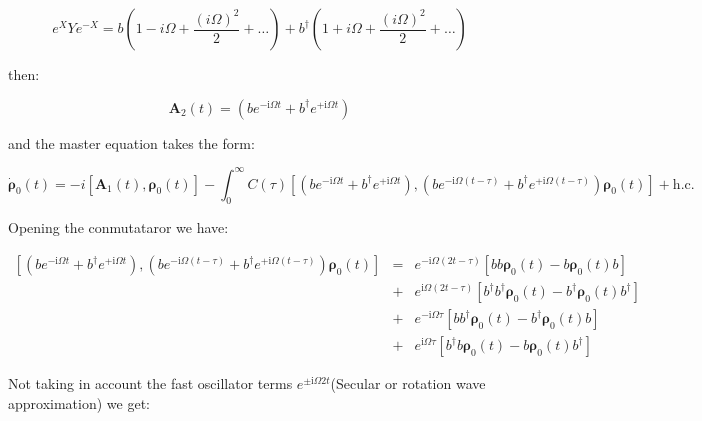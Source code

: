 \documentclass[%
preprint,
onecolumn,
notitlepag,
 amsmath,amssymb,
 aps,
 pra,
]{revtex4-2}
\begin{document}
\begin{equation}
\left.e^{X} Y e^{-X}= b \left( 1- i \Omega + \frac{(i\Omega )^2}{2} + \dots \right) + b^{\dagger} \left( 1+ i \Omega+ \frac{(i\Omega )^2}{2} + \dots \right)
\end{equation}

 then:


\begin{equation}\boldsymbol{A}_2(t)=\left(b e^{-\mathrm{i} \Omega t}+b^{\dagger} e^{+\mathrm{i} \Omega t}\right)\end{equation}

and the master equation takes the form:

\begin{equation}
\dot{\boldsymbol{\rho}}_0(t)=-i \left[ \boldsymbol{A}_1(t) , \boldsymbol{\rho}_0(t) \right]  -\int_{0}^{\infty} C(\tau)\left[\left(b e^{-\mathrm{i} \Omega t}+b^{\dagger} e^{+\mathrm{i} \Omega t}\right),\left(b e^{-\mathrm{i} \Omega(t-\tau)}+b^{\dagger} e^{+\mathrm{i} \Omega(t-\tau)}\right) \boldsymbol{\rho}_{\mathrm{0}}(t) \right]+\mathrm{h.c.}\end{equation}

Opening the conmutataror we have:

\begin{equation} 
\begin{align}
    \left[\left(b e^{-\mathrm{i} \Omega t}+b^{\dagger} e^{+\mathrm{i} \Omega t}\right),\left(b e^{-\mathrm{i} \Omega(t-\tau)}+b^{\dagger} e^{+\mathrm{i} \Omega(t-\tau)}\right) \boldsymbol{\rho}_{\mathrm{0}}(t) \right] &=& e^{-\mathrm{i} \Omega (2t - \tau)} \left[ bb \boldsymbol{\rho}_{\mathrm{0}}(t) -b \boldsymbol{\rho}_{\mathrm{0}}(t)  b \right] \\
    &+&  e^{\mathrm{i} \Omega (2t - \tau)} \left[ b^{\dagger}b ^{\dagger} \boldsymbol{\rho}_{\mathrm{0}}(t) -b ^{\dagger} \boldsymbol{\rho}_{\mathrm{0}}(t)  b ^{\dagger} \right] \\
    &+& e^{- \mathrm{i} \Omega \tau} \left[ b b ^{\dagger} \boldsymbol{\rho}_{\mathrm{0}}(t) -b ^{\dagger} \boldsymbol{\rho}_{\mathrm{0}}(t)  b  \right] \\
    &+& e^{\mathrm{i} \Omega   \tau} \left[ b^{\dagger}b \boldsymbol{\rho}_{\mathrm{0}}(t) -b  \boldsymbol{\rho}_{\mathrm{0}}(t)  b ^{\dagger} \right] 
\end{align}
\end{equation}

Not taking in account the fast oscillator terms $e^{\pm  \mathrm{i} \Omega 2t }$(Secular or rotation wave approximation) we get: 
\end{document}
